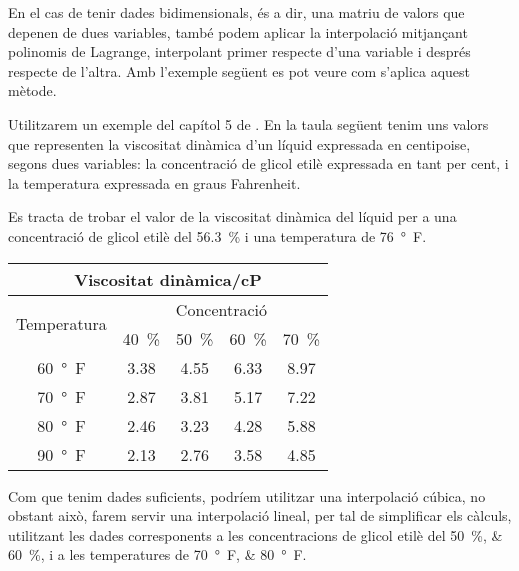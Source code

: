 En el cas de tenir dades bidimensionals, és a dir, una matriu de valors que depenen de dues variables, també podem aplicar la interpolació  mitjançant polinomis de Lagrange, interpolant primer respecte d'una variable i després respecte de l'altra. Amb l'exemple següent es pot veure com s'aplica aquest mètode.

	
\begin{exemple}\label{ex:InterpDuesDim}
	\addcontentsxms{\InterpDuesDim}	
    Utilitzarem un exemple del capítol 5 de \cite{EJB}. En la taula següent tenim uns valors que representen la viscositat dinàmica d'un líquid expressada en centipoise, segons dues variables: la concentració de glicol etilè
    expressada en tant per cent, i la temperatura expressada en graus Fahrenheit.
    
    Es tracta de trobar el valor de la viscositat dinàmica del líquid per a una concentració de glicol etilè
    del \qty{56,3}{\percent} i una temperatura de \qty{76}{\degree F}.

    \begin{center}
       \begin{tabular}{ccccc}
       \multicolumn{5}{c}{Viscositat dinàmica/cP}\\
       \toprule[1pt]
       \multirow{2}{25mm}{\rule{0mm}{4.5mm}Temperatura} & \multicolumn{4}{c}{Concentració}\\
       \cmidrule(rl){2-5}
                            & \qty{40}{\percent} & \qty{50}{\percent} & \qty{60}{\percent} & \qty{70}{\percent} \\
       \cmidrule(lr){1-5}
       \qty{60}{\degree F}  & \num{3,38}  & \num{4,55}  & \num{6,33}  & \num{8,97} \\
       \qty{70}{\degree F}  & \num{2,87}  & \num{3,81}  & \num{5,17}  & \num{7,22} \\
       \qty{80}{\degree F}  & \num{2,46}  & \num{3,23}  & \num{4,28}  & \num{5,88} \\
       \qty{90}{\degree F}  & \num{2,13}  & \num{2,76}  & \num{3,58}  & \num{4,85} \\
       \bottomrule[1pt]
       \end{tabular}
    \end{center}

    

    Com que tenim dades suficients, podríem utilitzar una interpolació cúbica, no obstant això, farem servir una interpolació lineal, per tal de simplificar els càlculs, utilitzant les dades corresponents  a les concentracions de glicol etilè del  \qtylist{50;60}{\percent}, i a les temperatures de  \qtylist{70;80}{\degree F}.


\end{exemple}
